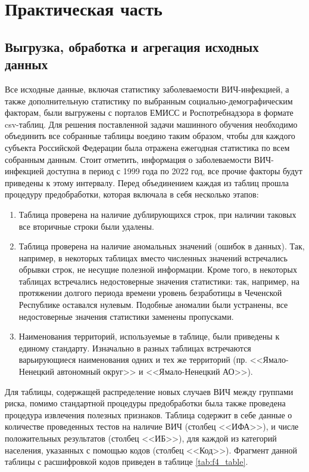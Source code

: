 \chapter{Практическая часть}
\label{ch:practice}
\linespread{1.5}
\section{Выгрузка, обработка и агрегация исходных данных}

Все исходные данные, включая статистику заболеваемости ВИЧ-инфекцией, а также дополнительную статистику по выбранным социально-демографическим факторам, были выгружены с порталов ЕМИСС и Роспотребнадзора в формате csv-таблиц. Для решения поставленной задачи машинного обучения необходимо объединить все собранные таблицы воедино таким образом, чтобы для каждого субъекта Российской Федерации была отражена ежегодная статистика по всем собранным данным. Стоит отметить, информация о заболеваемости ВИЧ-инфекцией доступна в период с 1999 года по 2022 год, все прочие факторы будут приведены к этому интервалу. Перед объединением каждая из таблиц прошла процедуру предобработки, которая включала в себя несколько этапов:

\begin{enumerate}
	\item Таблица проверена на наличие дублирующихся строк, при наличии таковых все вторичные строки были удалены.
	
	\item Таблица проверена на наличие аномальных значений (ошибок в данных). Так, например, в некоторых таблицах вместо численных значений встречались обрывки строк, не несущие полезной информации. Кроме того, в некоторых таблицах встречались недостоверные значения статистики: так, например, на протяжении долгого периода времени уровень безработицы в Чеченской Республике оставался нулевым. Подобные аномалии были устранены, все недостоверные значения статистики заменены пропусками.
	
	\item Наименования территорий, используемые в таблице, были приведены к единому стандарту. Изначально в разных таблицах встречаются варьирующиеся наименования одних и тех же территорий (пр. <<Ямало-Ненецкий автономный округ>> и <<Ямало-Ненецкий АО>>).
	
\end{enumerate}

Для таблицы, содержащей распределение новых случаев ВИЧ между группами риска, помимо стандартной процедуры предобработки была также проведена процедура извлечения полезных признаков. Таблица содержит в себе данные о количестве проведенных тестов на наличие ВИЧ (столбец <<ИФА>>), и числе положительных результатов (столбец <<ИБ>>), для каждой из категорий населения, указанных с помощью кодов (столбец <<Код>>). Фрагмент данной таблицы с расшифровкой кодов приведен в таблице \ref{tab:f4_table}.

